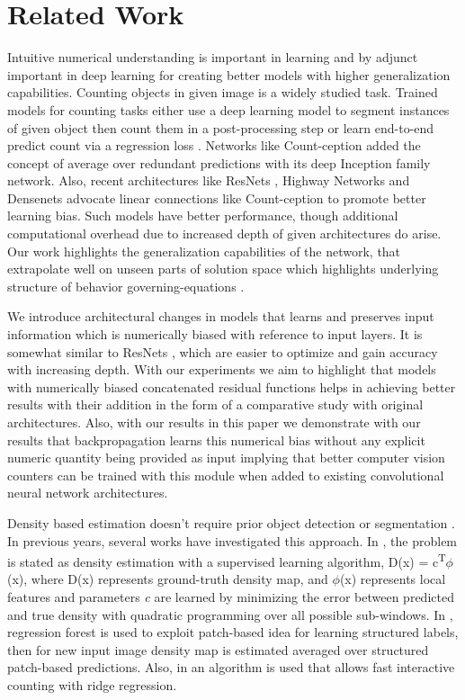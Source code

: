 \documentclass[runningheads]{llncs}
\begin{document}
\section{Related Work}

Intuitive numerical understanding is important in learning and by adjunct important in deep learning \cite{b1} for creating better models with higher generalization capabilities. Counting objects \cite{b12, b13, b14, b15, b16} in given image is a widely studied task. Trained models for counting tasks either use a deep learning model to segment instances of given object then count them in a post-processing step \cite{b17} or learn end-to-end predict count via a regression loss \cite{b4}.  Networks like Count-ception \cite{b18} added the concept of average over redundant predictions with its deep Inception family network.  Also, recent architectures like ResNets \cite{b19}, Highway Networks \cite{b20} and Densenets \cite{b21} advocate linear connections like Count-ception to promote better learning bias. Such models have better performance, though additional computational overhead due to increased depth of given architectures do arise. Our work highlights the generalization capabilities of the network, that extrapolate well on unseen parts of solution space which highlights underlying structure of behavior governing-equations \cite{b22}.

 We introduce architectural changes in models that learns and preserves input information which is numerically biased with reference to input layers. It is somewhat similar to ResNets \cite{b9}, which are easier to optimize and gain accuracy with increasing depth. With our experiments we aim to highlight that models with numerically biased concatenated residual functions helps in achieving better results with their addition in the form of a comparative study with original architectures. Also, with our results in this paper we demonstrate with our results that backpropagation learns this numerical bias without any explicit numeric quantity being provided as input implying that better computer vision counters can be trained with this module when added to existing convolutional neural network architectures.

Density based estimation doesn’t require prior object detection or segmentation \cite{b15, b12, b23}. In previous years, several works have investigated this approach. In \cite{b15}, the problem is stated as density estimation with a supervised learning algorithm, D(x) = c\textsuperscript{T}$\phi$(x), where D(x) represents  ground-truth density map, and $\phi$(x) represents  local features and parameters \textit{c} are learned by minimizing the error between predicted and true density with quadratic programming over all possible sub-windows. In \cite{b23}, regression forest is used to exploit patch-based idea for learning structured labels, then for new input image density map is estimated averaged over structured patch-based predictions. Also, in \cite{b12} an algorithm is used that allows fast interactive counting with ridge regression. 
\end{document}

